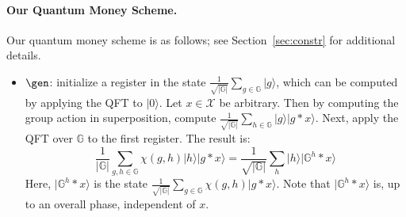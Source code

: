 \documentclass{article}\usepackage[a4paper,margin=20mm]{geometry}
\numberwithin{theorem}{section}
\numberwithin{equation}{section}
\newcommand{\G}{\mathbb{G}}
\newcommand{\Xs}{{\mathcal{X}}}
\begin{document}
\paragraph{Our Quantum Money Scheme.} Our quantum money scheme is as follows; see Section~\ref{sec:constr} for additional details.

\begin{itemize}
	\item $\gen$: initialize a register in the state $\frac{1}{\sqrt{|\G|}}\sum_{g\in\G}|g\rangle$, which can be computed by applying the QFT to $|0\rangle$. Let $x\in\Xs$ be arbitrary. Then by computing the group action in superposition, compute $\frac{1}{\sqrt{|\G|}}\sum_{h\in\G}|g\rangle|g*x\rangle$. Next, apply the QFT over $\G$ to the first register. The result is:
	\[\frac{1}{|\G|}\sum_{g,h\in\G} \chi(g,h)|h\rangle|g*x\rangle=\frac{1}{\sqrt{|\G|}}\sum_h |h\rangle|\G^h*x\rangle\]
	Here, $|\G^h*x\rangle$ is the state $\frac{1}{\sqrt{|\G|}}\sum_{g\in\G}\chi(g,h)|g*x\rangle$. Note that $|\G^h*x\rangle$ is, up to an overall phase, independent of $x$. 
	

\end{itemize}
\end{document}
